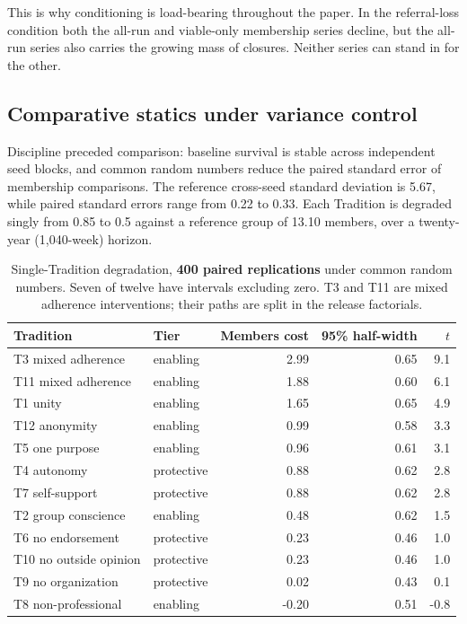 \documentclass[11pt,a4paper]{article}
\begin{document}
This is why conditioning is load-bearing throughout the paper. In the referral-loss
condition both the all-run and viable-only membership series decline, but the
all-run series also carries the growing mass of closures. Neither series can stand
in for the other.

\subsection{Comparative statics under variance control}

Discipline preceded comparison: baseline survival is stable across independent
seed blocks, and common random numbers reduce the paired standard error of
membership comparisons. The reference cross-seed standard deviation is 5.67,
while paired standard errors range from 0.22 to 0.33. Each Tradition is degraded
singly from 0.85 to 0.5 against a reference group of 13.10 members, over a twenty-year
(1,040-week) horizon.

\begin{table}[htbp]\centering\small
\begin{tabular}{@{}llrrr@{}}
\toprule
Tradition & Tier & Members cost & 95\% half-width & $t$ \\
\midrule
T3 mixed adherence    & enabling   & 2.99 & 0.65 & 9.1 \\
T11 mixed adherence   & enabling   & 1.88 & 0.60 & 6.1 \\
T1 unity              & enabling   & 1.65 & 0.65 & 4.9 \\
T12 anonymity         & enabling   & 0.99 & 0.58 & 3.3 \\
T5 one purpose        & enabling   & 0.96 & 0.61 & 3.1 \\
T4 autonomy           & protective & 0.88 & 0.62 & 2.8 \\
T7 self-support       & protective & 0.88 & 0.62 & 2.8 \\
T2 group conscience   & enabling   & 0.48 & 0.62 & 1.5 \\
T6 no endorsement     & protective & 0.23 & 0.46 & 1.0 \\
T10 no outside opinion& protective & 0.23 & 0.46 & 1.0 \\
T9 no organization    & protective & 0.02 & 0.43 & 0.1 \\
T8 non-professional   & enabling   & -0.20 & 0.51 & -0.8 \\
\bottomrule
\end{tabular}
\caption{Single-Tradition degradation, \textbf{400 paired replications} under
common random numbers. Seven of twelve have intervals excluding zero. T3 and T11
are mixed adherence interventions; their paths are split in the release factorials.}
\label{tab:tradition}
\end{table}
\end{document}
